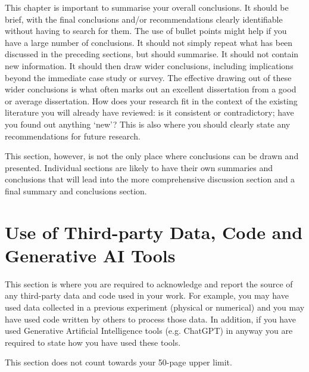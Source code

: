 \documentclass[a4paper,12pt]{article}
\begin{document}
This chapter is important to summarise your overall conclusions. It should be brief, with the final
conclusions and/or recommendations clearly identifiable without having to search for them. The use
of bullet points might help if you have a large number of conclusions. It should not simply repeat
what has been discussed in the preceding sections, but should summarise. It should not contain new information. It should then draw wider conclusions, including implications beyond the immediate case study or survey. The effective drawing out of these wider conclusions is what often marks out an excellent dissertation from a good or average dissertation. How does your research fit in the context of the existing literature you will already have reviewed: is it consistent or contradictory; have you found out anything `new'? This is also where you should clearly state any recommendations for future research.

This section, however, is not the only place where conclusions can be drawn and presented.  Individual sections are likely to have their own summaries and conclusions that will lead into the more comprehensive discussion section and a final summary and conclusions section.


\clearpage

\section{Use of Third-party Data, Code and Generative AI Tools}
\label{sec:DCG_Usaage}

This section is where you are required to acknowledge and report the source of any third-party data and code used in your work. For example, you may have used data collected in a previous experiment (physical or numerical) and you may have used code written by others to process those data. In addition, if you have used Generative Artificial Intelligence tools (e.g. ChatGPT) in anyway you are required to state how you have used these tools.

This section does not count towards your 50-page upper limit.

\clearpage




\end{document}
